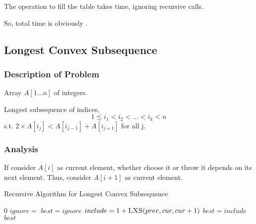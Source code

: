 The operation to fill the table takes  time, ignoring recursive calls.

So, total time is obviously .

\subsection{Longest Convex Subsequence}

\subsubsection{Description of Problem}

\AlgoInput Array $A[1\ldots n]$ of integers.

\AlgoOutput Longest subsequence of indices,
\[1 \leq i_1 < i_2 < ... < i_k < n\]
s.t. $2\times A[i_j] < A[i_{j-1}] + A[i_{j+1}]$ for all j.

\subsubsection{Analysis}
If consider $A[i]$ as current element, whether choose it or throw it depends on its
next element. Thus, consider $A[i+1]$ as current element.

\begin{algorithm}[h]
    \caption{Recursive Algorithm for Longest Convex Subsequence}\label{ori_lxs_alg}
    \begin{algorithmic}[1]
                \Return $0$
            \EndIf
            \State $ignore = $
            \State $best = ignore$
                \State $include = 1 + \textsc{LXS} (prev, cur, cur+1)$
                    \State $best = include$
                \EndIf
            \EndIf
            \Return $best$
        \EndProcedure
    \end{algorithmic}
    
\end{algorithm}

